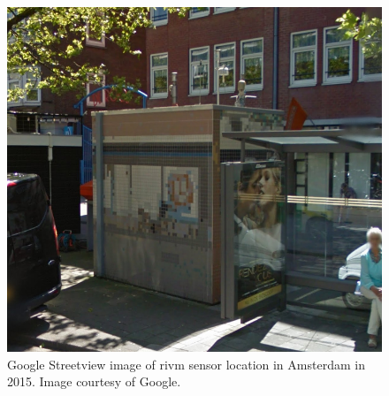 \begin{figure}
	\centering
	\includegraphics[width=0.8\linewidth]{figs/SensorAdam.png}
	\caption{Google Streetview image of \acs*{rivm} sensor location in Amsterdam in 2015. Image courtesy of Google.}
	\label{fig:Sensor}
\end{figure}


